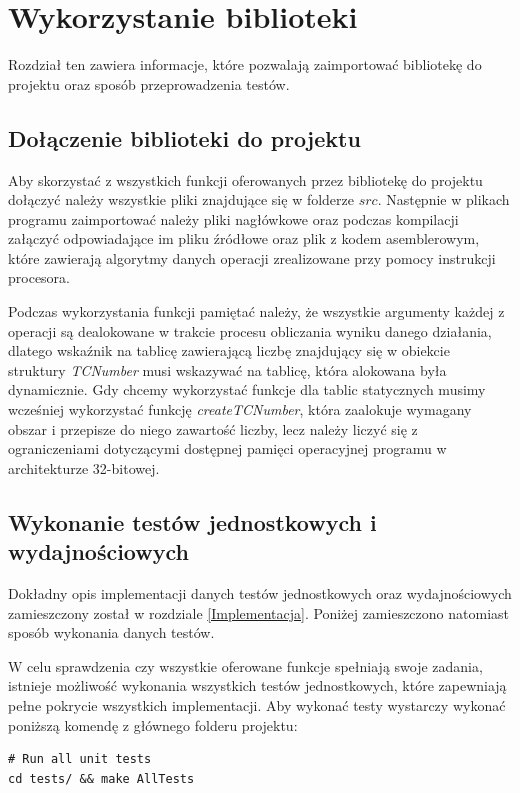 \documentclass{article}
\begin{document}
\section{Wykorzystanie biblioteki}

Rozdział ten zawiera informacje, które pozwalają zaimportować bibliotekę do projektu oraz sposób przeprowadzenia testów.

\subsection{Dołączenie biblioteki do projektu}

Aby skorzystać z wszystkich funkcji oferowanych przez bibliotekę do projektu dołączyć należy wszystkie pliki znajdujące się w folderze $src$. Następnie w plikach programu zaimportować należy pliki nagłówkowe oraz podczas kompilacji załączyć odpowiadające im pliku źródłowe oraz plik z kodem asemblerowym, które zawierają algorytmy danych operacji zrealizowane przy pomocy instrukcji procesora.

Podczas wykorzystania funkcji pamiętać należy, że wszystkie argumenty każdej z operacji są dealokowane w trakcie procesu obliczania wyniku danego działania, dlatego wskaźnik na tablicę zawierającą liczbę znajdujący się w obiekcie struktury \textit{TCNumber} musi wskazywać na tablicę, która alokowana była dynamicznie. Gdy chcemy wykorzystać funkcje dla tablic statycznych musimy wcześniej wykorzystać funkcję \textit{createTCNumber}, która zaalokuje wymagany obszar i przepisze do niego zawartość liczby, lecz należy liczyć się z ograniczeniami dotyczącymi dostępnej pamięci operacyjnej programu w architekturze 32-bitowej.

\subsection{Wykonanie testów jednostkowych i wydajnościowych}

Dokładny opis implementacji danych testów jednostkowych oraz wydajnościowych zamieszczony został w rozdziale \ref{Implementacja}. Poniżej zamieszczono natomiast sposób wykonania danych testów.

W celu sprawdzenia czy wszystkie oferowane funkcje spełniają swoje zadania, istnieje możliwość wykonania wszystkich testów jednostkowych, które zapewniają pełne pokrycie wszystkich implementacji.
Aby wykonać testy wystarczy wykonać poniższą komendę z głównego folderu projektu:

\begin{verbatim}
# Run all unit tests
cd tests/ && make AllTests
\end{verbatim}
\end{document}
